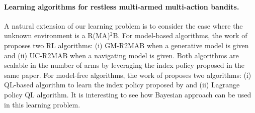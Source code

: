 \paragraph{Learning algorithms for restless multi-armed multi-action bandits.}
A natural extension of our learning problem is to consider the case where the unknown environment is a R(MA)$^2$B.
For model-based algorithms, the work of \cite{xiong2022learning} proposes two RL algorithms: (i) GM-R2MAB when a generative model is given and (ii) UC-R2MAB when a navigating model is given.
Both algorithms are scalable in the number of arms by leveraging the index policy proposed in the same paper.
For model-free algorithms, the work of \cite{killian2021q} proposes two algorithms: (i) QL-based algorithm to learn the index policy proposed by \cite{glazebrook2011general} and (ii) Lagrange policy QL algorithm.
It is interesting to see how Bayesian approach can be used in this learning problem.




\endgroup
